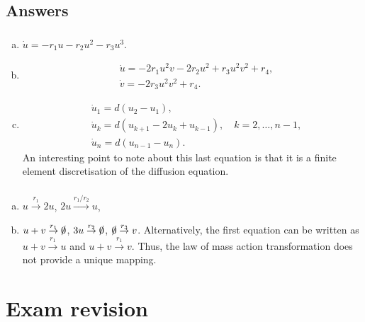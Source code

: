 \documentclass[]{article}
\begin{document}
\begin{Answ}
\subsection{Answers}
\subsubsection{}
\begin{enumerate}[(a)]
\item $\dot{u}=-r_1u-r_2u^2-r_3u^3$.
\item
\begin{align}
&\dot{u}=-2r_1u^2v-2r_2u^2+r_3u^2v^2+r_4,\nonumber\\
&\dot{v}=-2r_3u^2v^2+r_4.\nonumber
\end{align}
\item
\begin{align}
&\dot{u}_1=d(u_2-u_1),\nonumber\\
&\dot{u}_k=d(u_{k+1}-2u_k+u_{k-1}),\quad k=2,\dots,n-1,\nonumber\\
&\dot{u}_n=d(u_{n-1}-u_n).\nonumber
\end{align}
An interesting point to note about this last equation is that it is a finite element discretisation of the diffusion equation.
\end{enumerate}
\subsubsection{}
\begin{enumerate}[(a)]
\item $u\stackrel{r_1}{\rightarrow}2u$, $2u\stackrel{r_1/r_2}{\rightarrow}u$,
\item $u+v\stackrel{r_1}{\rightarrow}\slashed{0}$, $3u\stackrel{r_2}{\rightarrow}\slashed{0}$, $\slashed{0}\stackrel{r_3}{\rightarrow}v$. Alternatively, the first equation can be written as $u+v\stackrel{r_1}{\rightarrow}u$ and $u+v\stackrel{r_1}{\rightarrow}v$. Thus, the law of mass action transformation does not provide a unique mapping.
\end{enumerate}
\end{Answ}
\section*{Exam revision}
\end{document}
